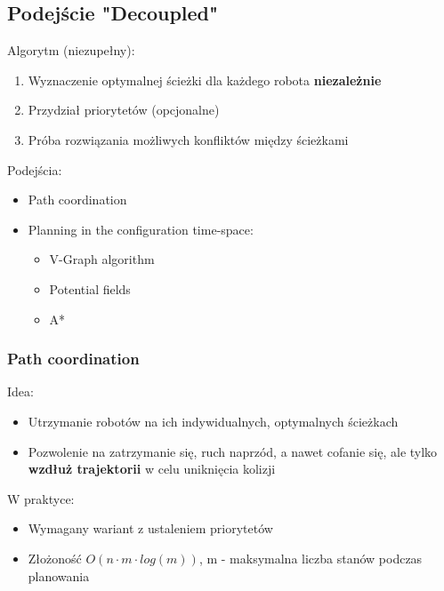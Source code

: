 \subsection{Podejście "Decoupled"}
Algorytm (niezupełny):
\begin{enumerate}
	\item Wyznaczenie optymalnej ścieżki dla każdego robota {\bf niezależnie}
	\item Przydział priorytetów (opcjonalne)
	\item Próba rozwiązania możliwych konfliktów między ścieżkami
\end{enumerate}
Podejścia:
\begin{itemize}
	\item Path coordination
	\item Planning in the configuration time-space: %
		\begin{itemize}
			\item V-Graph algorithm
			\item Potential fields
			\item A*
		\end{itemize}
\end{itemize}

\subsubsection{Path coordination}
Idea:
\begin{itemize}
	\item Utrzymanie robotów na ich indywidualnych, optymalnych ścieżkach
	\item Pozwolenie na zatrzymanie się, ruch naprzód, a nawet cofanie się, ale tylko {\bf wzdłuż trajektorii} w celu uniknięcia kolizji
\end{itemize}
W praktyce:
\begin{itemize}
	\item Wymagany wariant z ustaleniem priorytetów
	\item Złożoność $O(n \cdot m \cdot log(m))$, m - maksymalna liczba stanów podczas planowania %
\end{itemize}

